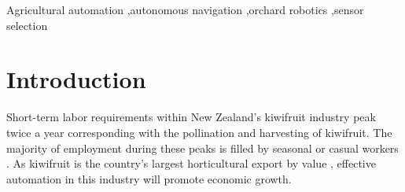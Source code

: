 \documentclass[preprint,authoryear,12pt]{elsarticle}
\begin{document}
\begin{frontmatter}
\begin{abstract}

\end{abstract}

\begin{keyword}

    Agricultural automation \sep autonomous navigation \sep orchard robotics \sep sensor selection
\end{keyword}

\end{frontmatter}

\linenumbers

\section{Introduction}
\label{sect:intro}
    Short-term labor requirements within New Zealand's kiwifruit industry peak twice a year corresponding with the pollination and harvesting of kiwifruit.
    The majority of employment during these peaks is filled by seasonal or casual workers \citep{Timmins2009}.
    As kiwifruit is the country's largest horticultural export by value \citep{StatisticsNewZealand2015}, effective automation in this industry will promote economic growth.
\end{document}
